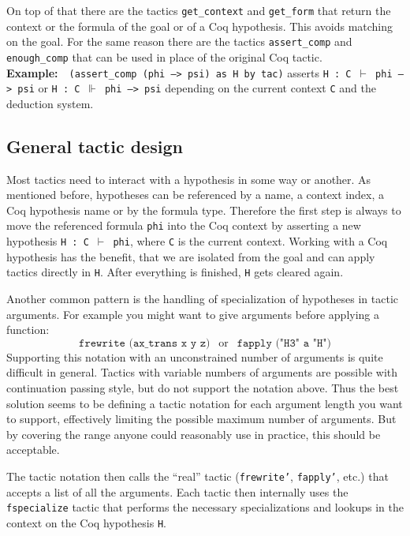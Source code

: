 \documentclass[12pt, a4paper]{article}
\newcommand{\coq}[1]{\texttt{#1}}
\newcommand{\example}[1]{\medskip\\\textbf{Example:}~~#1}
\begin{document}
\medskip\noindent
On top of that there are the tactics \texttt{get\_context} and \texttt{get\_form} that return the context or the formula of the goal or of a Coq hypothesis.
This avoids matching on the goal.
For the same reason there are the tactics \texttt{assert\_comp} and \texttt{enough\_comp} that can be used in place of the original Coq tactic.
\example{\coq{(assert_comp (phi --> psi) as H by tac)} asserts \texttt{H : C $\vdash$ phi --> psi} or \texttt{H : C $\Vdash$ phi --> psi} depending on the current context \texttt{C} and the deduction system.}



\subsection{General tactic design}

Most tactics need to interact with a hypothesis in some way or another.
As mentioned before, hypotheses can be referenced by a name, a context index, a Coq hypothesis name or by the formula type.
Therefore the first step is always to move the referenced formula \texttt{phi} into the Coq context by asserting a new hypothesis \texttt{H : C $\vdash$ phi}, where \texttt{C} is the current context.
Working with a Coq hypothesis has the benefit, that we are isolated from the goal and can apply tactics directly in \texttt{H}.
After everything is finished, \texttt{H} gets cleared again.

\medskip\noindent
Another common pattern is the handling of specialization of hypotheses in tactic arguments.
For example you might want to give arguments before applying a function:
$$\coq{frewrite (ax_trans x y z)} ~~\text{ or }~~ \coq{fapply ("H3" a "H")}$$
Supporting this notation with an unconstrained number of arguments is quite difficult in general.
Tactics with variable numbers of arguments are possible with continuation passing style, but do not support the notation above.
Thus the best solution seems to be defining a tactic notation for each argument length you want to support, effectively limiting the possible maximum number of arguments.
But by covering the range anyone could reasonably use in practice, this should be acceptable.

The tactic notation then calls the \enquote{real} tactic (\texttt{frewrite'}, \texttt{fapply'}, etc.) that accepts a list of all the arguments.
Each tactic then internally uses the \texttt{fspecialize} tactic that performs the necessary specializations and lookups in the context on the Coq hypothesis \texttt{H}.
\end{document}
